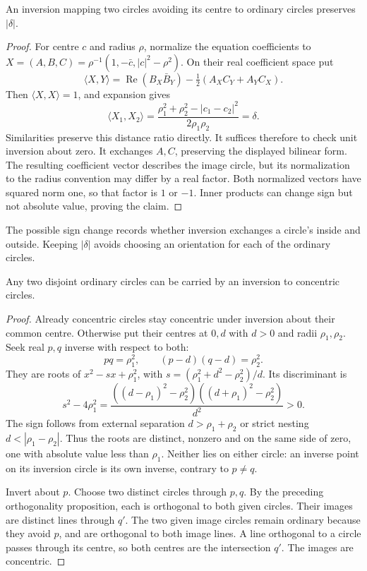 \begin{proposition}\label{geometry:prop:invdistance}
An inversion mapping two circles avoiding its centre to ordinary circles preserves $|\delta|$.
\end{proposition}
\begin{proof}
For centre $c$ and radius $\rho$, normalize the equation coefficients to
$X=(A,B,C)=\rho^{-1}(1,-\bar c,|c|^2-\rho^2)$. On their real coefficient space put
\[
\langle X,Y\rangle=\operatorname{Re}(B_X\bar B_Y)
-\tfrac12(A_XC_Y+A_YC_X).
\]
Then $\langle X,X\rangle=1$, and expansion gives
\[
\langle X_1,X_2\rangle
=\frac{\rho_1^2+\rho_2^2-|c_1-c_2|^2}{2\rho_1\rho_2}=\delta.
\]
Similarities preserve this distance ratio directly. It suffices therefore to check unit inversion about zero. It exchanges $A,C$, preserving the displayed bilinear form. The resulting coefficient vector describes the image circle, but its normalization to the radius convention may differ by a real factor. Both normalized vectors have squared norm one, so that factor is $1$ or $-1$. Inner products can change sign but not absolute value, proving the claim.
\end{proof}

The possible sign change records whether inversion exchanges a circle's inside and outside. Keeping $|\delta|$ avoids choosing an orientation for each of the ordinary circles.

\begin{lemma}\label{geometry:lem:concentric}
Any two disjoint ordinary circles can be carried by an inversion to concentric circles.
\end{lemma}
\begin{proof}
Already concentric circles stay concentric under inversion about their common centre. Otherwise put their centres at $0,d$ with $d>0$ and radii $\rho_1,\rho_2$. Seek real $p,q$ inverse with respect to both:
\[
pq=\rho_1^2,\qquad(p-d)(q-d)=\rho_2^2.
\]
They are roots of $x^2-sx+\rho_1^2$, with $s=(\rho_1^2+d^2-\rho_2^2)/d$. Its discriminant is
\[
s^2-4\rho_1^2=
\frac{((d-\rho_1)^2-\rho_2^2)((d+\rho_1)^2-\rho_2^2)}{d^2}>0.
\]
The sign follows from external separation $d>\rho_1+\rho_2$ or strict nesting $d<|\rho_1-\rho_2|$. Thus the roots are distinct, nonzero and on the same side of zero, one with absolute value less than $\rho_1$. Neither lies on either circle: an inverse point on its inversion circle is its own inverse, contrary to $p\ne q$.

Invert about $p$. Choose two distinct circles through $p,q$. By the preceding orthogonality proposition, each is orthogonal to both given circles. Their images are distinct lines through $q'$. The two given image circles remain ordinary because they avoid $p$, and are orthogonal to both image lines. A line orthogonal to a circle passes through its centre, so both centres are the intersection $q'$. The images are concentric.
\end{proof}

